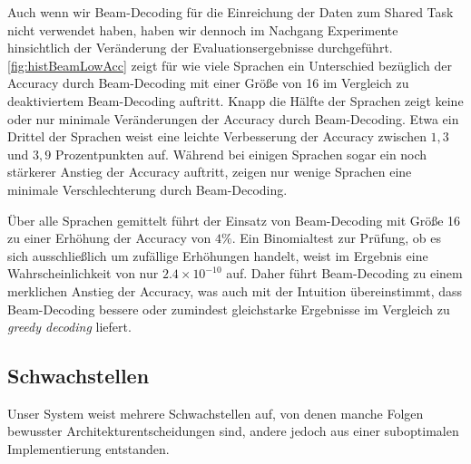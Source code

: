 \documentclass[11pt,a4paper]{article}
\begin{document}
Auch wenn wir Beam-Decoding für die Einreichung der Daten zum Shared Task nicht verwendet haben, haben wir dennoch im Nachgang Experimente hinsichtlich der Veränderung der Evaluationsergebnisse durchgeführt.
\autoref{fig:histBeamLowAcc} zeigt für wie viele Sprachen ein Unterschied bezüglich der Accuracy durch Beam-Decoding mit einer Größe von 16 im Vergleich zu deaktiviertem Beam-Decoding auftritt.
Knapp die Hälfte der Sprachen zeigt keine oder nur minimale Veränderungen der Accuracy durch Beam-Decoding.
Etwa ein Drittel der Sprachen weist eine leichte Verbesserung der Accuracy zwischen $1,3$ und $3,9$ Prozentpunkten auf.
Während bei einigen Sprachen sogar ein noch stärkerer Anstieg der Accuracy auftritt, zeigen nur wenige Sprachen eine minimale Verschlechterung durch Beam-Decoding.

Über alle Sprachen gemittelt führt der Einsatz von Beam-Decoding mit Größe 16 zu einer Erhöhung der Accuracy von $4\%$.
Ein Binomialtest zur Prüfung, ob es sich ausschließlich um zufällige Erhöhungen handelt, weist im Ergebnis eine Wahrscheinlichkeit von nur $2.4 \times 10^{-10}$ auf.
Daher führt Beam-Decoding zu einem merklichen Anstieg der Accuracy, was auch mit der Intuition übereinstimmt, dass Beam-Decoding bessere oder zumindest gleichstarke Ergebnisse im Vergleich zu \textit{greedy decoding} liefert.

\subsection{Schwachstellen}
\label{sec:schwachstellen}
Unser System weist mehrere Schwachstellen auf, von denen manche Folgen bewusster Architekturentscheidungen sind, andere jedoch aus einer suboptimalen Implementierung entstanden.
\end{document}
